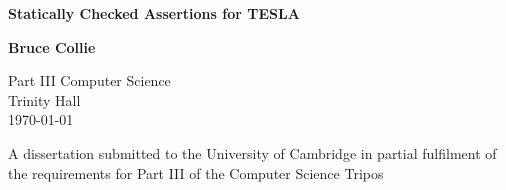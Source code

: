 \begin{titlepage}
  \begin{center}
  
  \vspace*{1cm}
  \Huge\textbf{Statically Checked Assertions for TESLA}

  \LARGE
  \vspace{1.5cm}
  \textbf{Bruce Collie}

  \vspace{0.5cm}


  \large
  Part III Computer Science \\
  Trinity Hall \\
  \today

  \vfill

  \vspace{1.5cm}

  \normalsize
  A dissertation submitted to the University of Cambridge in partial fulfilment
    of the requirements for Part III of the Computer Science Tripos
  \end{center}
\end{titlepage}
